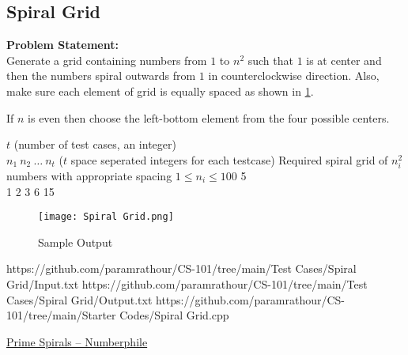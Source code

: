 \documentclass[../../Problems]{subfiles}
\begin{document}
\subsection{Spiral Grid}
\textbf{Problem Statement:}\\
Generate a grid containing numbers from $1$ to $n^2$ such that $1$ is at center and then the numbers spiral outwards from $1$ in counterclockwise direction. Also, make sure each element of grid is equally spaced as shown in \ref{fig:spiralgrid}.
\begin{note}
	If $n$ is even then choose the left-bottom element from the four possible centers.
\end{note}
\begin{comment}
	\begin{figure}[H]
		\centering
		\begin{subfigure}{0.4\linewidth}
			\centering
			\begin{tabular}{rrrr}
			16 & 15 & 14 & 13 \\
			5  & 4  & 3  & 12 \\
			6  & 1  & 2  & 11 \\
			7  & 8  & 9  & 10
			\end{tabular}
			\caption{$n=4$}
		\end{subfigure}
		\begin{subfigure}{0.4\linewidth}
			\centering
			\begin{tabular}{rrrrr}
			17 & 16 & 15 & 14 & 13 \\
			18 & 5  & 4  & 3  & 12 \\
			19 & 6  & 1  & 2  & 11 \\
			20 & 7  & 8  & 9  & 10 \\
			21 & 22 & 23 & 24 & 25
			\end{tabular}
			\caption{$n=5$}
		\end{subfigure}
		\caption{Spiral Grid}
		\label{fig:spiralgrid}
	\end{figure}
\end{comment}
\begin{testcasesMore}
	{$t$ \hfill(number of test cases, an integer)\\$n_1\ n_2\ \ldots\ n_t$ \hfill($t$ space seperated integers for each testcase)}
	{Required spiral grid of $n_i^2$ numbers with appropriate spacing}
	{$1 \leq n_i \leq 100$}
	{5\\1 2 3 6 15}
	{\vspace{-2em}\begin{figure}[H]
		\texttt{[image: Spiral Grid.png]}
		\caption{Sample Output}
		\label{fig:spiralgrid}
	\end{figure}
	}
	{https://github.com/paramrathour/CS-101/tree/main/Test Cases/Spiral Grid/Input.txt}
	{https://github.com/paramrathour/CS-101/tree/main/Test Cases/Spiral Grid/Output.txt}
	{https://github.com/paramrathour/CS-101/tree/main/Starter Codes/Spiral Grid.cpp}
\end{testcasesMore}
\begin{funvideo}
\href{https://youtu.be/iFuR97YcSLM}{Prime Spirals -- Numberphile}
\end{funvideo}
\end{document}
